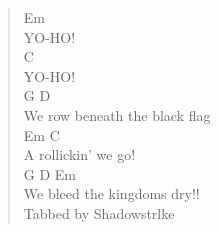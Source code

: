 \documentclass[11pt]{article}
\begin{document}
\begin{verse}
\hspace*{3em}Em\\
YO-HO!\\
\hspace*{3em}C\\
YO-HO!\\
\hspace*{3em}G               D\\
We row beneath the black flag\\
\hspace*{5em}Em         C\\
A rollickin' we go!\\
\hspace*{3em}G         D        Em\\
We bleed the kingdoms dry!!\\
\vspace*{1em}
Tabbed by Shadowstrlke\\
\end{verse}
\clearpage
\end{document}
